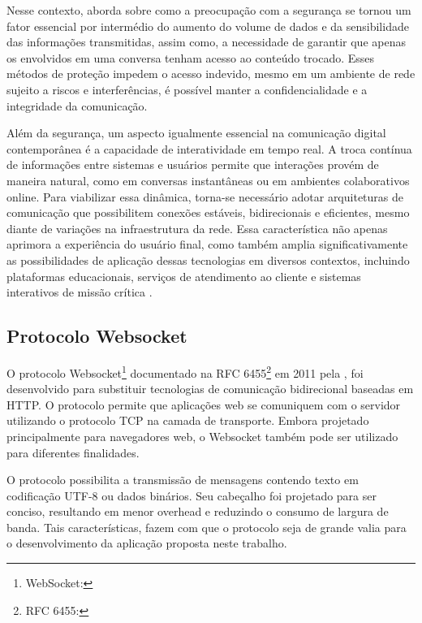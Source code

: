 Nesse contexto,  aborda sobre como a preocupação com a
segurança se tornou um fator essencial por intermédio do aumento do
volume de dados e da sensibilidade das informações transmitidas,
assim como, a necessidade de garantir que apenas os envolvidos em uma
conversa tenham acesso ao conteúdo trocado. Esses métodos  de
proteção impedem o acesso indevido, mesmo em um ambiente de rede
sujeito a riscos e interferências, é possível manter a
confidencialidade e a integridade da comunicação.

Além da segurança, um aspecto igualmente essencial na comunicação
digital contemporânea é a capacidade de interatividade em tempo
real. A troca contínua de informações entre sistemas e usuários
permite que interações provém de maneira natural, como em conversas
instantâneas ou em ambientes colaborativos online. Para viabilizar
essa dinâmica, torna-se necessário adotar arquiteturas de comunicação
que possibilitem conexões estáveis, bidirecionais e eficientes, mesmo
diante de variações na infraestrutura da rede. Essa característica
não apenas aprimora a experiência do usuário final, como também
amplia significativamente as possibilidades de aplicação dessas
tecnologias em diversos contextos, incluindo plataformas
educacionais, serviços de atendimento ao cliente e sistemas
interativos de missão crítica .

\subsection{Protocolo Websocket}

O protocolo Websocket\footnote{WebSocket:
} documentado na RFC 6455\footnote{RFC 6455:
} em 2011 pela
, foi desenvolvido para substituir
tecnologias de comunicação bidirecional baseadas em \acs{HTTP}. O protocolo
permite que aplicações web se comuniquem com o servidor utilizando o
protocolo \acs{TCP} na camada de transporte. Embora projetado
principalmente para navegadores web, o Websocket também pode ser
utilizado para diferentes finalidades.

O protocolo possibilita a transmissão de mensagens contendo texto em
codificação UTF-8 ou dados binários. Seu cabeçalho foi projetado para
ser conciso, resultando em menor overhead e reduzindo o consumo de
largura de banda. Tais características, fazem com que o protocolo
seja de grande valia para o desenvolvimento da aplicação proposta
neste trabalho.

